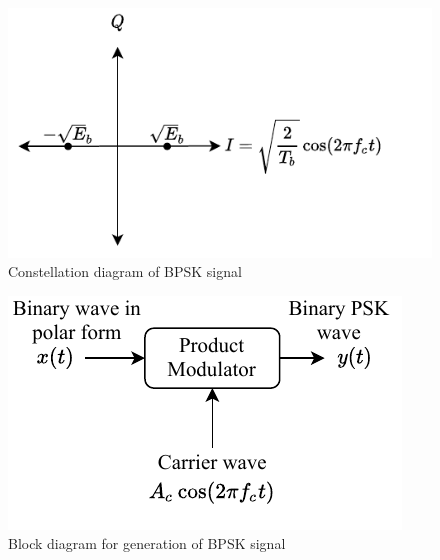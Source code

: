\documentclass{lab_sheet}
\begin{document}
\begin{figure}[H]
    \centering
    \includegraphics{../Figures/psk_const}
    \caption{Constellation diagram of BPSK signal}
    \label{fig:bpsk_const}
\end{figure}

\begin{figure}[H]
    \centering
    \includegraphics{../Figures/psk_block}
    \caption{Block diagram for generation of BPSK signal}
    \label{fig:bpsk_block}
\end{figure}
\end{document}
